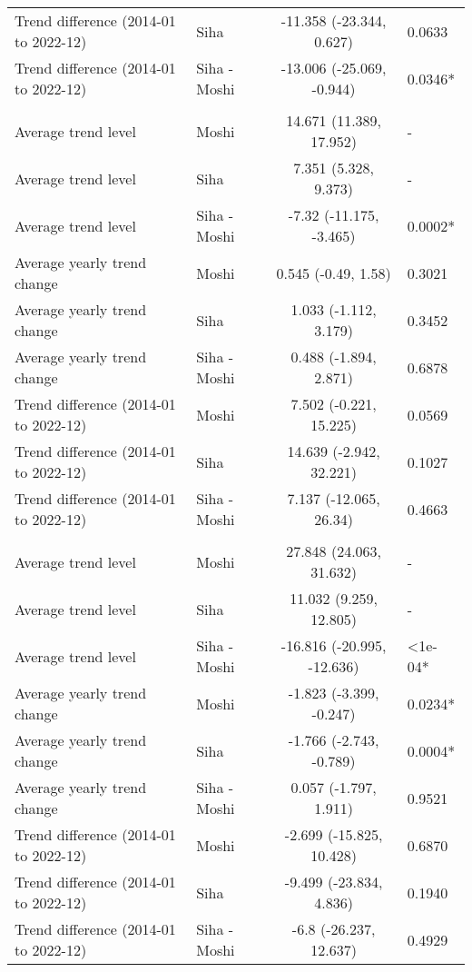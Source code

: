 \begin{longtable}{l|lcl}
Trend difference (2014-01 to 2022-12) & Siha & -11.358 (-23.344, 0.627) & 0.0633 \\ 
Trend difference (2014-01 to 2022-12) & Siha - Moshi & -13.006 (-25.069, -0.944) & 0.0346* \\ 
\midrule\addlinespace[2.5pt]
\multicolumn{4}{l}{Substance Abuse} \\ 
\midrule\addlinespace[2.5pt]
Average trend level & Moshi & 14.671 (11.389, 17.952) & - \\ 
Average trend level & Siha & 7.351 (5.328, 9.373) & - \\ 
Average trend level & Siha - Moshi & -7.32 (-11.175, -3.465) & 0.0002* \\ 
Average yearly trend change & Moshi & 0.545 (-0.49, 1.58) & 0.3021 \\ 
Average yearly trend change & Siha & 1.033 (-1.112, 3.179) & 0.3452 \\ 
Average yearly trend change & Siha - Moshi & 0.488 (-1.894, 2.871) & 0.6878 \\ 
Trend difference (2014-01 to 2022-12) & Moshi & 7.502 (-0.221, 15.225) & 0.0569 \\ 
Trend difference (2014-01 to 2022-12) & Siha & 14.639 (-2.942, 32.221) & 0.1027 \\ 
Trend difference (2014-01 to 2022-12) & Siha - Moshi & 7.137 (-12.065, 26.34) & 0.4663 \\ 
\midrule\addlinespace[2.5pt]
\multicolumn{4}{l}{Tuberculosis} \\ 
\midrule\addlinespace[2.5pt]
Average trend level & Moshi & 27.848 (24.063, 31.632) & - \\ 
Average trend level & Siha & 11.032 (9.259, 12.805) & - \\ 
Average trend level & Siha - Moshi & -16.816 (-20.995, -12.636) & <1e-04* \\ 
Average yearly trend change & Moshi & -1.823 (-3.399, -0.247) & 0.0234* \\ 
Average yearly trend change & Siha & -1.766 (-2.743, -0.789) & 0.0004* \\ 
Average yearly trend change & Siha - Moshi & 0.057 (-1.797, 1.911) & 0.9521 \\ 
Trend difference (2014-01 to 2022-12) & Moshi & -2.699 (-15.825, 10.428) & 0.6870 \\ 
Trend difference (2014-01 to 2022-12) & Siha & -9.499 (-23.834, 4.836) & 0.1940 \\ 
Trend difference (2014-01 to 2022-12) & Siha - Moshi & -6.8 (-26.237, 12.637) & 0.4929 \\ 

\end{longtable}

